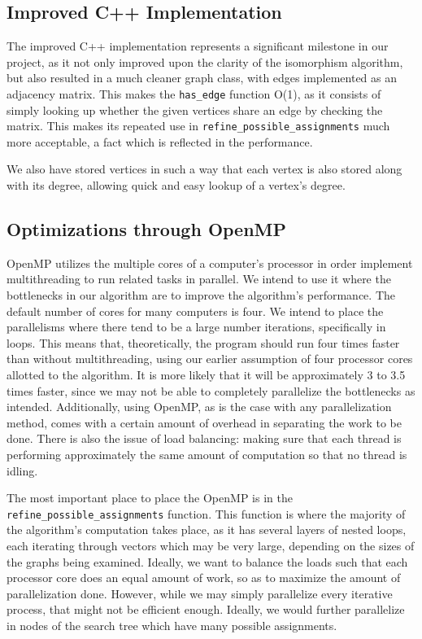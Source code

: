 \documentclass{article}
\begin{document}
  \subsection{Improved C++ Implementation}

  The improved C++ implementation represents a significant milestone in our project, as it not only improved upon the clarity of the isomorphism algorithm, but also resulted in a much cleaner graph class, with edges implemented as an adjacency matrix. This makes the \texttt{has\_edge} function O(1), as it consists of simply looking up whether the given vertices share an edge by checking the matrix. This makes its repeated use in \texttt{refine\_possible\_assignments} much more acceptable, a fact which is reflected in the performance.

  We also have stored vertices in such a way that each vertex is also stored along with its degree, allowing quick and easy lookup of a vertex's degree.

  \subsection{Optimizations through OpenMP}
  OpenMP utilizes the multiple cores of a computer's processor in order implement multithreading to run related tasks in parallel. We intend to use it where the bottlenecks in our algorithm are to improve the algorithm's performance. The default number of cores for many computers is four. We intend to place the parallelisms where there tend to be a large number iterations, specifically in loops. This means that, theoretically, the program should run four times faster than without multithreading, using our earlier assumption of four processor cores allotted to the algorithm. It is more likely that it will be approximately 3 to 3.5 times faster, since we may not be able to completely parallelize the bottlenecks as intended. Additionally, using OpenMP, as is the case with any parallelization method, comes with a certain amount of overhead in separating the work to be done. There is also the issue of load balancing: making sure that each thread is performing approximately the same amount of computation so that no thread is idling.

  The most important place to place the OpenMP is in the \texttt{refine\_possible\_assignments} function. This function is where the majority of the algorithm's computation takes place, as it has several layers of nested loops, each iterating through vectors which may be very large, depending on the sizes of the graphs being examined. Ideally, we want to balance the loads such that each processor core does an equal amount of work, so as to maximize the amount of parallelization done. However, while we may simply parallelize every iterative process, that might not be efficient enough. Ideally, we would further parallelize in nodes of the search tree which have many possible assignments.
\end{document}
